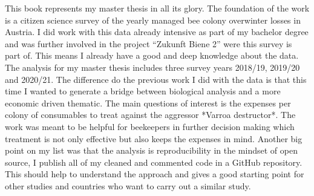 \label{sec:Preface}

This book represents my master thesis in all its glory. The foundation of the work is a citizen science survey of the yearly managed bee colony overwinter losses in Austria. I did work with this data already intensive as part of my bachelor degree and was further involved in the project \enquote{Zukunft Biene 2} were this survey is part of. This means I already have a good and deep knowledge about the data. The analysis for my master thesis includes three survey years 2018/19, 2019/20 and 2020/21. The difference do the previous work I did with the data is that this time I wanted to generate a bridge between biological analysis and a more economic driven thematic. The main questions of interest is the expenses per colony of consumables to treat against the aggressor *Varroa destructor*. The work was meant to be helpful for beekeepers in further decision making which treatment is not only effective but also keeps the expenses in mind. Another big point on my list was that the analysis is  reproducibility in the mindset of open source, I publish all of my cleaned and commented code in a GitHub repository. This should help to understand the approach and gives a good starting point for other studies and countries who want to carry out a similar study.
